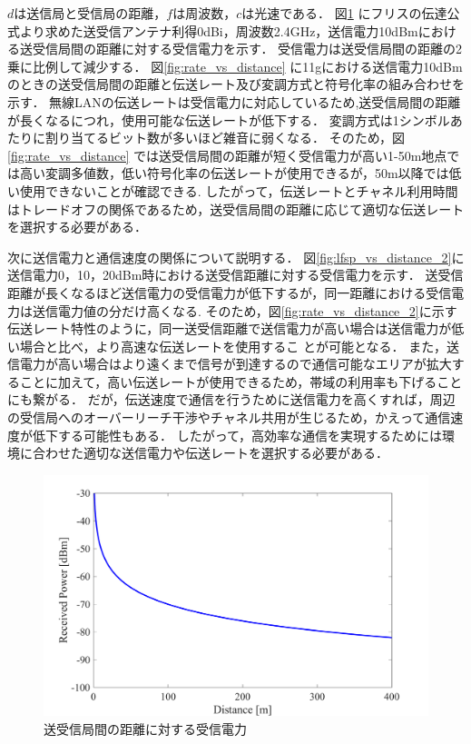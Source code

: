 \documentclass[a4paper,10.5pt]{ltjsarticle}
\begin{document}
$d$は送信局と受信局の距離，$f$は周波数，$c$は光速である．
\clearpage
図\ref{fig:Received power_vs_distance} にフリスの伝達公式より求めた送受信アンテナ利得0dBi，周波数2.4GHz，送信電力10dBmにおける送受信局間の距離に対する受信電力を示す．
受信電力は送受信局間の距離の2乗に比例して減少する．
図\ref{fig:rate_vs_distance} に11gにおける送信電力10dBmのときの送受信局間の距離と伝送レート及び変調方式と符号化率の組み合わせを示す．
無線LANの伝送レートは受信電力に対応しているため,送受信局間の距離が長くなるにつれ，使用可能な伝送レートが低下する．
変調方式は1シンボルあたりに割り当てるビット数が多いほど雑音に弱くなる．
そのため，図\ref{fig:rate_vs_distance} では送受信局間の距離が短く受信電力が高い1-50m地点では高い変調多値数，低い符号化率の伝送レートが使用できるが，50m以降では低い使用できないことが確認できる.
したがって，伝送レートとチャネル利用時間はトレードオフの関係であるため，送受信局間の距離に応じて適切な伝送レートを選択する必要がある．\par
次に送信電力と通信速度の関係について説明する．
図\ref{fig:lfsp_vs_distance_2}に送信電力0，10，20dBm時における送受信距離に対する受信電力を示す．
送受信距離が長くなるほど送信電力の受信電力が低下するが，同一距離における受信電力は送信電力値の分だけ高くなる.
そのため，図\ref{fig:rate_vs_distance_2}に示す伝送レート特性のように，同一送受信距離で送信電力が高い場合は送信電力が低い場合と比べ，より高速な伝送レートを使用するこ
とが可能となる．
また，送信電力が高い場合はより遠くまで信号が到達するので通信可能なエリアが拡大することに加えて，高い伝送レートが使用できるため，帯域の利用率も下げることにも繋がる．
だが，伝送速度で通信を行うために送信電力を高くすれば，周辺の受信局へのオーバーリーチ干渉やチャネル共用が生じるため，かえって通信速度が低下する可能性もある．
したがって，高効率な通信を実現するためには環境に合わせた適切な送信電力や伝送レートを選択する必要がある．


\begin{figure}[H]
  \centering
  \includegraphics[width=\linewidth]{lfsp_vs_distance.pdf} %
  \caption{送受信局間の距離に対する受信電力}
  \label{fig:Received power_vs_distance} %
\end{figure}
\end{document}
